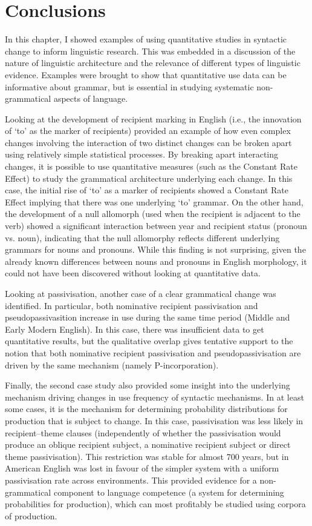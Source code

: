 \section{Conclusions}
	In this chapter, I showed examples of using quantitative studies in syntactic change to inform linguistic research. This was embedded in a discussion of the nature of linguistic architecture and the relevance of different types of linguistic evidence. Examples were brought to show that quantitative use data can be informative about grammar, but is essential in studying systematic non-grammatical aspects of language.
	
	Looking at the development of recipient marking in English (i.e., the innovation of `to' as the marker of recipients) provided an example of how even complex changes involving the interaction of two distinct changes can be broken apart using relatively simple statistical processes. By breaking apart interacting changes, it is possible to use quantitative measures (such as the Constant Rate Effect) to study the grammatical architecture underlying each change. In this case, the initial rise of `to' as a marker of recipients showed a Constant Rate Effect implying that there was one underlying `to' grammar. On the other hand, the development of a null allomorph (used when the recipient is adjacent to the verb) showed a significant interaction between year and recipient status (pronoun vs. noun), indicating that the null allomorphy reflects different underlying grammars for nouns and pronouns. While this finding is not surprising, given the already known differences between nouns and pronouns in English morphology, it could not have been discovered without looking at quantitative data.
	
	Looking at passivisation, another case of a clear grammatical change was identified. In particular, both nominative recipient passivisation and pseudopassivasition increase in use during the same time period (Middle and Early Modern English). In this case, there was insufficient data to get quantitative results, but the qualitative overlap gives tentative support to the notion that both nominative recipient passivisation and pseudopassivisation are driven by the same mechanism (namely P-incorporation).

	Finally, the second case study also provided some insight into the underlying mechanism driving changes in use frequency of syntactic mechanisms. In at least some cases, it is the mechanism for determining probability distributions for production that is subject to change. In this case, passivisation was less likely in recipient--theme clauses (independently of whether the passivisation would produce an oblique recipient subject, a nominative recipient subject or direct theme passivisation). This restriction was stable for almost 700 years, but in American English was lost in favour of the simpler system with a uniform passivisation rate across environments. This provided evidence for a non-grammatical component to language competence (a system for determining probabilities for production), which can most profitably be studied using corpora of production.

%
